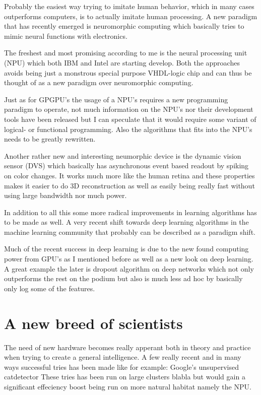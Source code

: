 \documentclass{article}
\begin{document}
    Probably the easiest way trying to imitate human behavior, which in many
    cases outperforms computers, is to actually
    imitate human processing. A new paradigm that has recently emerged is neuromorphic
    computing which basically tries to mimic neural functions with electronics.
    
    The freshest and most promising according to me is the 
    neural processing unit (NPU) which both IBM\cite{synapse} and
    Intel\cite{intelneuro} are starting develop. Both the approaches avoids being
    just a monstrous special purpose VHDL-logic chip and can thus be thought of
    as a new paradigm over neuromorphic computing.

    Just as for GPGPU's the usage of a NPU's requires a new programming paradigm to
    operate, not much information on the NPU's nor their development tools
    have been released but I can speculate that it would require some variant of
    logical- or functional programming. Also the algorithms that fits into the
    NPU's needs to be greatly rewritten.
    
    Another rather new and interesting neumorphic device is the
    dynamic vision sensor (DVS) which basically has asynchronous event based
    readout by spiking on color changes.\cite{dvs} It works much more like the human retina and
    these properties makes it easier to do 3D reconstruction as well as easily
    being really fast without using large bandwidth nor much power.

    In addition to all this some more radical improvements in learning
    algorithms has to be made as well. A very recent shift towards deep
    learning algorithms in the machine learning community that probably can be
    described as a paradigm shift. 
   
    Much of the recent success in deep learning is due to the new found computing
    power from 
    GPU's as I mentioned before as well as a new look on deep learning. A great
    example the later is dropout algorithm on deep networks which not only
    outperforms the rest on the podium but also is much less ad hoc by
    basically only log some of the features.\cite{dropout}

\section{A new breed of scientists}
    The need of new hardware becomes really apperant both in
    theory and practice when trying to create a general intelligence.
    A few really recent and in many ways successful tries has been made
    like for example: Google's unsupervised catdetector %
    These tries has been run on large clusters blabla but would gain a
    significant effeciency boost being run on more natural habitat namely the
    NPU. 


    
    
\end{document}
